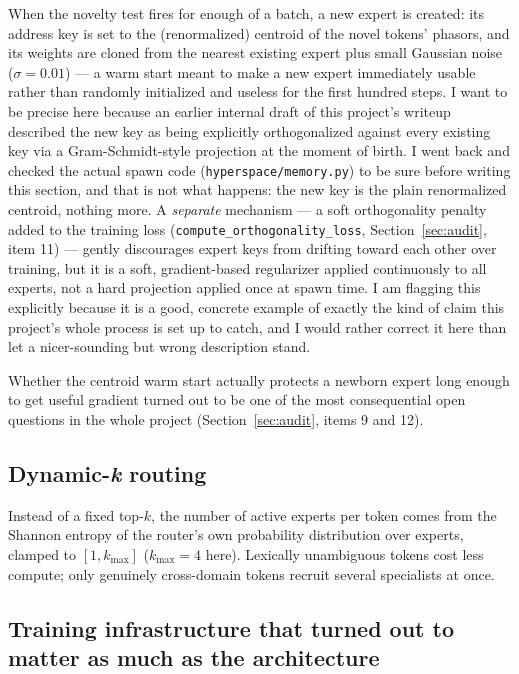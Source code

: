 \documentclass[11pt,letterpaper]{article}
\begin{document}
When the novelty test fires for enough of a batch, a new expert is created: its address key is set to the (renormalized) centroid of the novel tokens' phasors, and its weights are cloned from the nearest existing expert plus small Gaussian noise ($\sigma = 0.01$) --- a warm start meant to make a new expert immediately usable rather than randomly initialized and useless for the first hundred steps. I want to be precise here because an earlier internal draft of this project's writeup described the new key as being explicitly orthogonalized against every existing key via a Gram-Schmidt-style projection at the moment of birth. I went back and checked the actual spawn code (\texttt{hyperspace/memory.py}) to be sure before writing this section, and that is not what happens: the new key is the plain renormalized centroid, nothing more. A \emph{separate} mechanism --- a soft orthogonality penalty added to the training loss (\texttt{compute\_orthogonality\_loss}, Section~\ref{sec:audit}, item 11) --- gently discourages expert keys from drifting toward each other over training, but it is a soft, gradient-based regularizer applied continuously to all experts, not a hard projection applied once at spawn time. I am flagging this explicitly because it is a good, concrete example of exactly the kind of claim this project's whole process is set up to catch, and I would rather correct it here than let a nicer-sounding but wrong description stand.

Whether the centroid warm start actually protects a newborn expert long enough to get useful gradient turned out to be one of the most consequential open questions in the whole project (Section~\ref{sec:audit}, items 9 and 12).

\subsection{Dynamic-\emph{k} routing}

Instead of a fixed top-$k$, the number of active experts per token comes from the Shannon entropy of the router's own probability distribution over experts, clamped to $[1, k_{\max}]$ ($k_{\max}=4$ here). Lexically unambiguous tokens cost less compute; only genuinely cross-domain tokens recruit several specialists at once.

\subsection{Training infrastructure that turned out to matter as much as the architecture}
\label{sec:training-infra}
\end{document}
